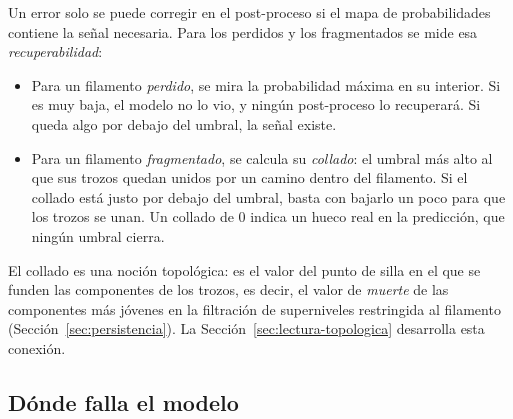 Un error solo se puede corregir en el post-proceso si el mapa de
probabilidades contiene la señal necesaria. Para los perdidos y los
fragmentados se mide esa \emph{recuperabilidad}:
\begin{itemize}
  \item Para un filamento \emph{perdido}, se mira la probabilidad máxima
  en su interior. Si es muy baja, el modelo no lo vio, y ningún
  post-proceso lo recuperará. Si queda algo por debajo del umbral, la
  señal existe.
  \item Para un filamento \emph{fragmentado}, se calcula su
  \emph{collado}: el umbral más alto al que sus trozos quedan unidos por
  un camino dentro del filamento. Si el collado está justo por debajo del
  umbral, basta con bajarlo un poco para que los trozos se unan. Un
  collado de $0$ indica un hueco real en la predicción, que ningún umbral
  cierra.
\end{itemize}
El collado es una noción topológica: es el valor del punto de silla en
el que se funden las componentes de los trozos, es decir, el valor de
\emph{muerte} de las componentes más jóvenes en la filtración de
superniveles restringida al filamento (Sección~\ref{sec:persistencia}).
La Sección~\ref{sec:lectura-topologica} desarrolla esta conexión.

\subsection{Dónde falla el modelo}

